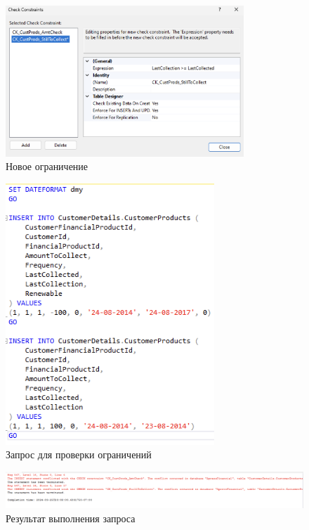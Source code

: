 \documentclass[a4paper, 14pt]{extarticle}
\begin{document}
\begin{figure}[H]
  \centering
  \includegraphics[width=0.8\textwidth]{images/task-1/17.png}
  \caption{Новое ограничение}
  \label{fig:task-1-17}
\end{figure}

\begin{figure}[H]
  \centering
  \includegraphics[width=0.7\textwidth]{images/task-1/18.png}
  \caption{Запрос для проверки ограничений}
  \label{fig:task-1-18}
\end{figure}

\begin{figure}[H]
  \centering
  \includegraphics[width=\textwidth]{images/task-1/19.png}
  \caption{Результат выполнения запроса}
  \label{fig:task-1-19}
\end{figure}
\end{document}

